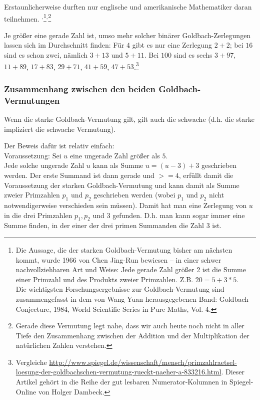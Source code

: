 \begin{refsegment}
{     Erstaunlicherweise durften nur englische und amerikanische Mathematiker
     daran teilnehmen.
     }${}^,$\footnote{%
     Die Aussage, die der starken Goldbach-Vermutung bisher am nächsten kommt,
     wurde 1966 von Chen Jing-Run bewiesen -- in einer schwer nachvollziehbaren
     Art und Weise: Jede gerade Zahl größer 2 ist die Summe einer Primzahl und
     des Produkts zweier Primzahlen. Z.B. $20=5+3*5.$\\
     Die wichtigsten Forschungsergebnisse zur Goldbach-Vermutung sind
     zusammengefasst in dem von Wang Yuan herausgegebenen Band:
     \glqq Goldbach Conjecture\grqq, 1984, World Scientific Series in Pure
     Maths, Vol. 4.
     }${}^,$\footnote{%
     Gerade diese Vermutung legt nahe, dass wir auch heute noch nicht in
     aller Tiefe den Zusammenhang zwischen der Addition und der Multiplikation
     der natürlichen Zahlen verstehen.
     }  %

Je größer eine gerade Zahl ist, umso mehr solcher binärer Goldbach-Zerlegungen lassen sich im Durchschnitt finden: Für $4$ gibt es nur eine Zerlegung $2 + 2$; bei $16$ sind es schon zwei, nämlich $3 + 13$ und $5 + 11$. Bei $100$ sind es sechs $3 + 97$, $11 + 89$, $17 + 83$, $29 + 71$, $41 + 59$, $47 + 53$.\footnote{%
   Vergleiche \url{http://www.spiegel.de/wissenschaft/mensch/primzahlraetsel-loesung-der-goldbachschen-vermutung-rueckt-naeher-a-833216.html}. Dieser Artikel gehört in die Reihe
   der gut lesbaren Numerator-Kolumnen in Spiegel-Online von Holger Dambeck.
   }   %




\subsubsection{Zusammenhang zwischen den beiden Goldbach-Ver\-mutungen}%

 Wenn die starke Goldbach-Vermutung gilt, gilt auch die schwache (d.h. die starke impliziert die schwache Vermutung).

Der Beweis dafür ist relativ einfach:\\
Voraussetzung: Sei $u$ eine ungerade Zahl größer als $5$.\\
Jede solche ungerade Zahl $u$ kann als Summe
$u = (u-3) + 3$ geschrieben werden. Der erste Summand ist dann gerade und $>= 4$, erfüllt
damit die Voraussetzung der starken Goldbach-Vermutung und kann damit als Summe zweier
Primzahlen $p_1$ und $p_2$ geschrieben werden (wobei $p_1$ und $p_2$ nicht notwendigerweise verschieden sein müssen). Damit hat man eine Zerlegung von $u$ in die drei Primzahlen $p_1, p_2$ und $3$ gefunden.
D.h. man kann sogar immer eine Summe finden, in der einer der drei primen Summanden die Zahl $3$ ist.


\end{refsegment}
